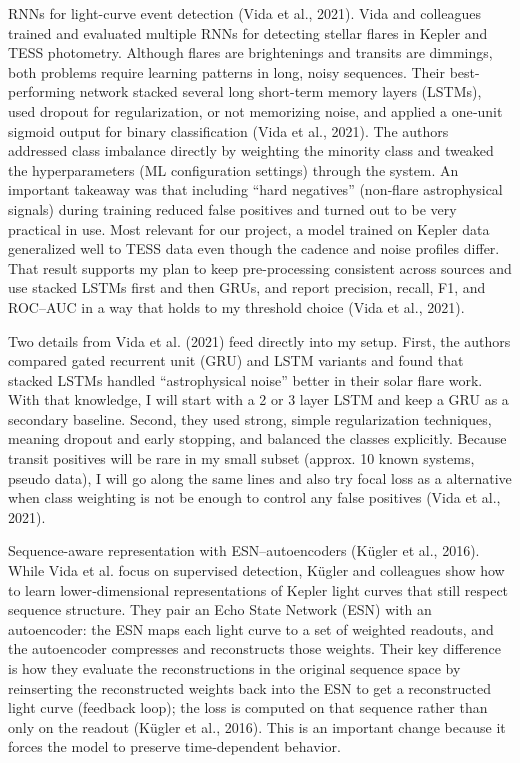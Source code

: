 \documentclass[letterpaper]{article} %
\begin{document}
RNNs for light-curve event detection (Vida et al., 2021). Vida and colleagues trained and evaluated multiple RNNs for detecting stellar flares in Kepler and TESS photometry. Although flares are brightenings and transits are dimmings, both problems require learning patterns in long, noisy sequences. Their best-performing network stacked several long short-term memory layers (LSTMs), used dropout for regularization, or not memorizing noise, and applied a one‑unit sigmoid output for binary classification (Vida et al., 2021). The authors addressed class imbalance directly by weighting the minority class and tweaked the hyperparameters (ML configuration settings) through the system. An important takeaway was that including “hard negatives” (non‑flare astrophysical signals) during training reduced false positives and turned out to be very practical in use. Most relevant for our project, a model trained on Kepler data generalized well to TESS data even though the cadence and noise profiles differ. That result supports my plan to keep pre-processing consistent across sources and use stacked LSTMs first and then GRUs, and report precision, recall, F1, and ROC–AUC in a way that holds to my threshold choice (Vida et al., 2021).

Two details from Vida et al. (2021) feed directly into my setup. First, the authors compared gated recurrent unit (GRU) and LSTM variants and found that stacked LSTMs handled “astrophysical noise” better in their solar flare work. With that knowledge, I will start with a 2 or 3 layer LSTM and keep a GRU as a secondary baseline. Second, they used strong, simple regularization techniques, meaning dropout and early stopping, and balanced the classes explicitly. Because transit positives will be rare in my small subset (approx. 10 known systems, pseudo data), I will go along the same lines and also try focal loss as a alternative when class weighting is not be enough to control any false positives (Vida et al., 2021).

Sequence-aware representation with ESN–autoencoders (Kügler et al., 2016). While Vida et al. focus on supervised detection, Kügler and colleagues show how to learn lower‑dimensional representations of Kepler light curves that still respect sequence structure. They pair an Echo State Network (ESN) with an autoencoder: the ESN maps each light curve to a set of weighted readouts, and the autoencoder compresses and reconstructs those weights. Their key difference is how they evaluate the reconstructions in the original sequence space by reinserting the reconstructed weights back into the ESN to get a reconstructed light curve (feedback loop); the loss is computed on that sequence rather than only on the readout (Kügler et al., 2016). This is an important change because it forces the model to preserve time‑dependent behavior.
\end{document}
